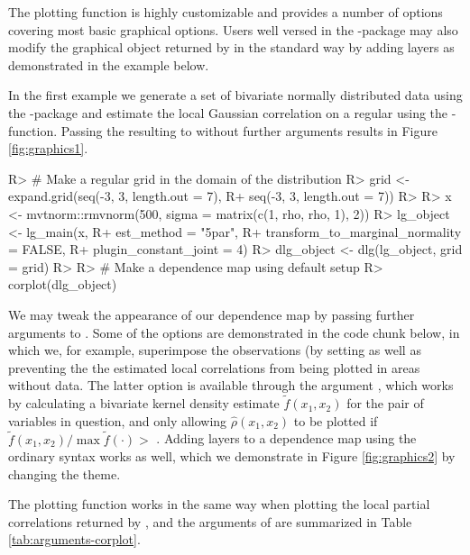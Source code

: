 The plotting function is highly customizable and provides a number of options covering most basic graphical options. Users well versed in the -package may also modify the graphical object returned by  in the standard way by adding layers as demonstrated in the example below.

In the first example we generate a set of bivariate normally distributed data using the -package \citep{gentz:etal:2018} and estimate the local Gaussian correlation on a regular  using the -function. Passing the resulting  to  without further arguments results in Figure \ref{fig:graphics1}.

\begin{example}
R> # Make a regular grid in the domain of the distribution
R> grid <- expand.grid(seq(-3, 3, length.out = 7),
R+                     seq(-3, 3, length.out = 7))
R> 
R> x <- mvtnorm::rmvnorm(500, sigma = matrix(c(1, rho, rho, 1), 2))
R> lg_object <- lg_main(x, 
R+                      est_method = "5par", 
R+                      transform_to_marginal_normality = FALSE,
R+                      plugin_constant_joint = 4)
R> dlg_object <- dlg(lg_object, grid = grid)
R> 
R> # Make a dependence map using default setup
R> corplot(dlg_object)
\end{example}


We may tweak the appearance of our dependence map by passing further arguments to . Some of the options are demonstrated in the code chunk below, in which we, for example, superimpose the observations (by setting  as well as preventing the the estimated local correlations from being plotted in areas without data. The latter option is available through the argument , which works by calculating a bivariate kernel density estimate \(\tilde f\left(x_1, x_2\right)\) for the pair of  variables in question, and only allowing \(\widehat \rho\left(x_1,x_2\right)\) to be plotted if \(\tilde f\left(x_1,x_2\right)/\max\tilde f\left(\cdot\right) >\) . Adding layers to a dependence map using the ordinary  syntax works as well, which we demonstrate in Figure \ref{fig:graphics2} by changing the  theme.

The plotting function works in the same way when plotting the local partial correlations returned by , and the arguments of  are summarized in Table \ref{tab:arguments-corplot}.

